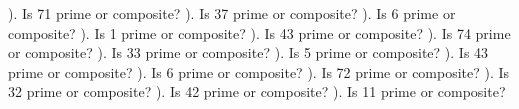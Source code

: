 \documentclass{article}%
\begin{document}
\newline%
\newline%
). Is 71 prime or composite?%
\newline%
\newline%
). Is 37 prime or composite?%
\newline%
\newline%
). Is 6 prime or composite?%
\newline%
\newline%
). Is 1 prime or composite?%
\newline%
\newline%
). Is 43 prime or composite?%
\newline%
\newline%
). Is 74 prime or composite?%
\newline%
\newline%
). Is 33 prime or composite?%
\newline%
\newline%
). Is 5 prime or composite?%
\newline%
\newline%
). Is 43 prime or composite?%
\newline%
\newline%
). Is 6 prime or composite?%
\newline%
\newline%
). Is 72 prime or composite?%
\newline%
\newline%
). Is 32 prime or composite?%
\newline%
\newline%
). Is 42 prime or composite?%
\newline%
\newline%
). Is 11 prime or composite?%
\newline%
\newline%
\end{document}

